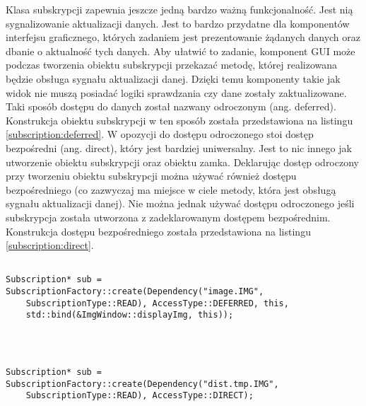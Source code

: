 Klasa subskrypcji zapewnia jeszcze jedną bardzo ważną funkcjonalność. Jest nią sygnalizowanie aktualizacji danych. Jest to bardzo przydatne dla komponentów interfejsu graficznego, których zadaniem jest prezentowanie żądanych danych oraz dbanie o aktualność tych danych. Aby ułatwić to zadanie, komponent GUI może podczas tworzenia obiektu subskrypcji przekazać metodę, której realizowana będzie obsługa sygnału aktualizacji danej. Dzięki temu komponenty takie jak widok nie muszą posiadać logiki sprawdzania czy dane zostały zaktualizowane. Taki sposób dostępu do danych został nazwany odroczonym (ang. deferred). Konstrukcja obiektu subskrypcji w ten sposób została przedstawiona na listingu \ref{subscription:deferred}. W opozycji do dostępu odroczonego stoi dostęp bezpośredni (ang. direct), który jest bardziej uniwersalny. Jest to nic innego jak utworzenie obiektu subskrypcji oraz obiektu zamka. Deklarując dostęp odroczony przy tworzeniu obiektu subskrypcji można używać również dostępu bezpośredniego (co zazwyczaj ma miejsce w ciele metody, która jest obsługą sygnału aktualizacji danej). Nie można jednak używać dostępu odroczonego jeśli subskrypcja została utworzona z zadeklarowanym dostępem bezpośrednim. Konstrukcja dostępu bezpośredniego została przedstawiona na listingu \ref{subscription:direct}.

\begin{minipage}{\textwidth}
	\begin{lstlisting}[label=subscription:deferred, caption={Przykład tworzenia obiektu subskrypcji z odroczonym dostępem do danych },alsoletter={()[].=}]
	
Subscription* sub = SubscriptionFactory::create(Dependency("image.IMG",
	SubscriptionType::READ), AccessType::DEFERRED, this,
	std::bind(&ImgWindow::displayImg, this));
	
	
	\end{lstlisting}
\end{minipage}

\begin{minipage}{\textwidth}
	\begin{lstlisting}[label=subscription:direct, caption={Przykład tworzenia obiektu subskrypcji z bezpośrednim dostępem do danych },alsoletter={()[].=}]
	
Subscription* sub = SubscriptionFactory::create(Dependency("dist.tmp.IMG",
	SubscriptionType::READ), AccessType::DIRECT);
	
	\end{lstlisting}
\end{minipage}

